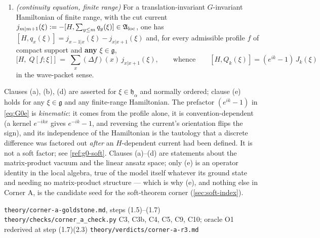 \begin{theorem}
\begin{enumerate}
\item[(e)] \emph{(continuity equation, finite range)} For a translation-invariant
  $G$-invariant Hamiltonian of finite range, with the cut current
  $j_{m|m+1}(\xi):=-[H,\sum_{y\le m}q_y(\xi)]\in\mathfrak{A}_{\mathrm{loc}}$, one has
  $[H,q_x(\xi)]=j_{x-1|x}(\xi)-j_{x|x+1}(\xi)$ and, for every admissible profile
  $f$ of compact support and \textbf{any} $\xi\in\mathfrak{g}$,
  \begin{equation}
    \bigl[H,\;Q[f;\xi]\bigr] \;=\; \sum_x (\Delta f)(x)\, j_{x|x+1}(\xi),
    \qquad\text{whence}\qquad
    [H,Q_k(\xi)]=(e^{ik}-1)\,J_k(\xi)
    \label{eq:G0e}
  \end{equation}
  in the wave-packet sense.
\end{enumerate}
\end{theorem}

\begin{scope}
Clauses (a), (b), (d) are asserted for $\xi\in\mathfrak{h}_\alpha$ and normally
ordered; clause (e) holds for any $\xi\in\mathfrak{g}$ and any finite-range
Hamiltonian.  The prefactor $(e^{ik}-1)$ in \cref{eq:G0e} is \emph{kinematic}: it
comes from the profile alone, it is convention-dependent (a kernel $e^{-ikx}$
gives $e^{-ik}-1$, and reversing the current's orientation flips the sign), and
its independence of the Hamiltonian is the tautology that a discrete difference
was factored out \emph{after} an $H$-dependent current had been defined.  It is
not a soft factor; see \cref{ref:g0-soft}.  Clauses (a)--(d) are statements about
the matrix-product vacuum and the linear ansatz space; only (e) is an operator
identity in the local algebra, true of the model itself whatever its ground state
and needing no matrix-product structure --- which is why (e), and nothing else in
Corner A, is the candidate seed for the soft-theorem corner
(\cref{sec:soft-index}).
\end{scope}

%
{\texttt{theory/corner-a-goldstone.md}, steps (1.5)--(1.7)}%
{\texttt{theory/checks/corner\_a\_check.py} C3, C3b, C4, C5, C9, C10; oracle O1 rederived at step (1.7)(2.3)}%
{\texttt{theory/verdicts/corner-a-r3.md}}

